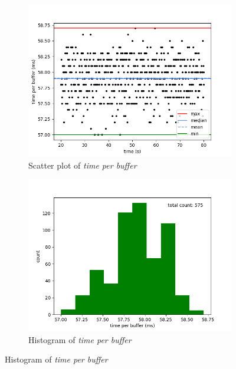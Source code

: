 \begin{figure}[H]
    \centering

    \begin{subfigure}[t]{0.5\textwidth}
        \centering
        \includegraphics[scale=0.45]{img/synthetic_pings_wait_100us_per_buffer_scatter.png}
        \caption{Scatter plot of \textit{time per buffer}}
    \end{subfigure}%
    \begin{subfigure}[t]{0.5\textwidth}
        \centering
        \includegraphics[scale=0.45]{img/synthetic_pings_wait_100us_per_buffer_hist.png}
        \caption{Histogram of \textit{time per buffer}}
    \end{subfigure}


\end{figure}

